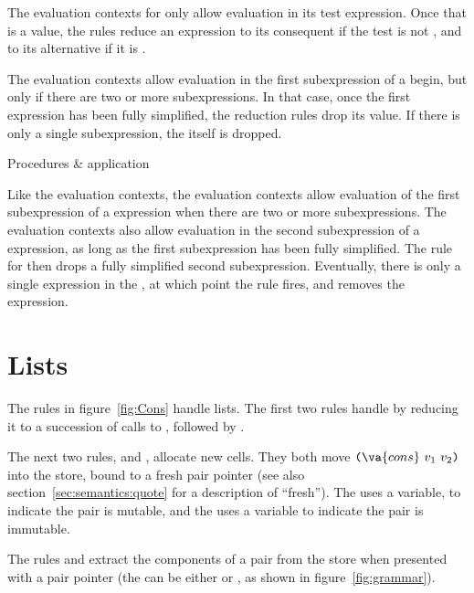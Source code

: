 The evaluation contexts for  only allow evaluation in its
test expression. Once that is a value, the rules reduce
an  expression to its consequent if the test is not
\semfalse{}, and to its alternative if it is \semfalse{}.

The  evaluation contexts allow evaluation in the first
subexpression of a begin, but only if there are two or more
subexpressions. In that case, once the first expression has been fully
simplified, the reduction rules drop its value. If there is only a
single subexpression, the  itself is dropped.

\subfigurestart{}
\beginfig
\begin{center}

\end{center}
\caption{Procedures \& application}\label{fig:Procedure--application}
\endfig

Like the  evaluation contexts, the 
evaluation contexts allow evaluation of the first subexpression of a
 expression when there are two or more subexpressions.
The  evaluation contexts also allow evaluation in the
second subexpression of a  expression, as long as the first
subexpression has been fully simplified. The  rule for
 then drops a fully simplified second subexpression.
Eventually, there is only a single expression in the ,
at which point the  rule fires, and removes the
 expression.

\section{Lists}\label{sec:semantics:lists}

The rules in figure~\ref{fig:Cons} handle lists. The first two rules handle  by reducing it to a succession of calls to , followed by .

The next two rules,  and , allocate new  cells.
They both move $\texttt{(}\va{cons}~v_1~v_2\texttt{)}$ into the store, bound to a fresh
pair pointer (see also section~\ref{sec:semantics:quote} for a description of ``fresh'').
The  uses a  variable, to indicate the pair is mutable, and the  uses a  variable to indicate the pair is immutable.

The rules  and  extract the components of a pair from the store when presented with a pair pointer (the  can be either  or , as shown in figure~\ref{fig:grammar}).

